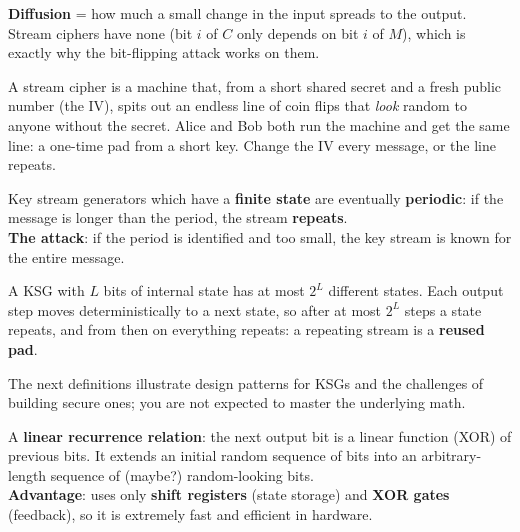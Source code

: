 \begin{rembox}[title=Diffusion]
\textbf{Diffusion} = how much a small change in the input spreads to the output. Stream
ciphers have none (bit $i$ of $C$ only depends on bit $i$ of $M$), which is exactly why
the bit-flipping attack works on them.
\end{rembox}

\begin{goatbox}
A stream cipher is a machine that, from a short shared secret and a fresh public number (the IV),
spits out an endless line of coin flips that \emph{look} random to anyone without the secret.
Alice and Bob both run the machine and get the same line: a one-time pad from a short key. Change
the IV every message, or the line repeats.
\end{goatbox}

\begin{defnbox}[title=Periodicity of key stream generators]
Key stream generators which have a \textbf{finite state} are eventually
\textbf{periodic}: if the message is longer than the period, the stream
\textbf{repeats}. \\
\textbf{The attack}: if the period is identified and too small, the key stream is known
for the entire message.
\end{defnbox}

\begin{rembox}[title=Why finite state implies periodic]
A KSG with $L$ bits of internal state has at most $2^L$ different states. Each output
step moves deterministically to a next state, so after at most $2^L$ steps a state
repeats, and from then on everything repeats: a repeating stream is a \textbf{reused
pad}.
\end{rembox}

\begin{rembox}[title=Interlude on building KSGs]
The next definitions illustrate design patterns for KSGs and the challenges of building
secure ones; you are not expected to master the underlying math.
\end{rembox}

\begin{defnbox}[title=Linear Feedback Shift Register (LFSR)]
A \textbf{linear recurrence relation}: the next output bit is a linear function (XOR) of
previous bits. It extends an initial random sequence of bits into an arbitrary-length
sequence of (maybe?) random-looking bits. \\
\textbf{Advantage}: uses only \textbf{shift registers} (state storage) and \textbf{XOR
gates} (feedback), so it is extremely fast and efficient in hardware.
\end{defnbox}

